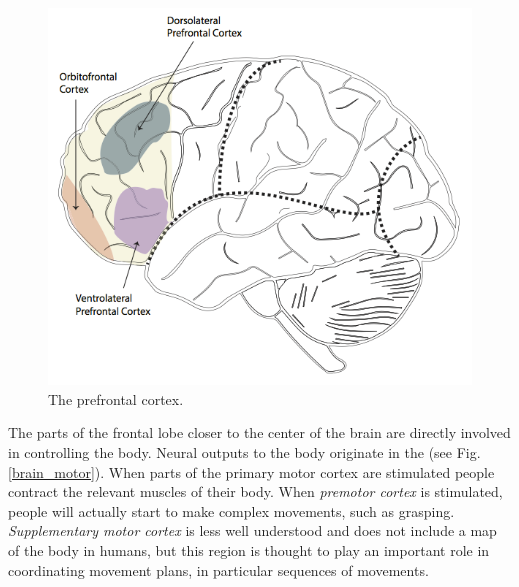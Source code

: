 \begin{figure}[h]
\centering
\includegraphics[scale=.75]{./images/brain_frontal.png}
\caption[Pamela Payne.]{The prefrontal cortex.}
\label{brain_frontal}
\end{figure}

The parts of the frontal lobe closer to the center of the brain are directly involved in controlling the body. Neural outputs to the body originate in the  (see Fig. \ref{brain_motor}). When parts of the primary motor cortex are stimulated people contract the relevant muscles of their body. When \emph{premotor cortex} is stimulated, people will actually start to make complex movements, such as grasping. \emph{Supplementary motor cortex} is less well understood and does not include a map of the body in humans, but this region is thought to play an important role in coordinating movement plans, in particular sequences of movements.

